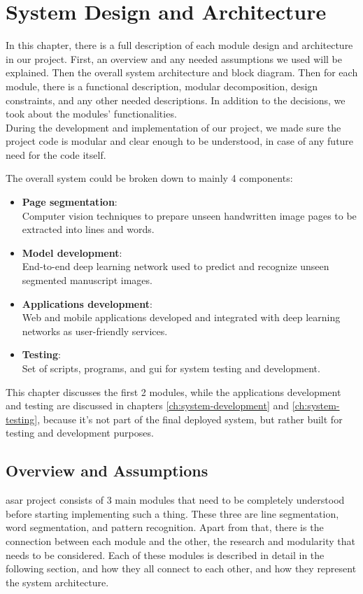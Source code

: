 \chapter{System Design and Architecture}
\label{ch:system-design}
\quad In this chapter, there is a full description of each module design and architecture in our project. First, an overview and any needed assumptions we used will be explained. Then the overall system architecture and block diagram. Then for each module, there is a functional description, modular decomposition, design constraints, and any other needed descriptions. In addition to the decisions, we took about the modules' functionalities. \\

During the development and implementation of our project, we made sure the project code is modular and clear enough to be understood, in case of any future need for the code itself.

\bigskip
\noindent 
The overall system could be broken down to mainly 4 components:
\begin{itemize}[itemsep=1pt, topsep=5pt]
    \item \textbf{Page segmentation}: \\Computer vision techniques to prepare unseen handwritten image pages to be extracted into lines and words.
    \item \textbf{Model development}:\\ End-to-end deep learning network used to predict and recognize unseen segmented manuscript images.
    \item \textbf{Applications development}:\\ Web and mobile applications developed and integrated with deep learning networks as user-friendly services. 
    \item \textbf{Testing}:\\ Set of scripts, programs, and \acrfull{gui} for system testing and development. 
\end{itemize}

This chapter discusses the first 2 modules, while the applications development and testing are discussed in chapters \ref{ch:system-development} and \ref{ch:system-testing}, because it's not part of the final deployed system, but rather built for testing and development purposes.

\clearpage

\section{Overview and Assumptions}
\acrshort{asar} project consists of 3 main modules that need to be completely understood before starting implementing such a thing. These three are line segmentation, word segmentation, and pattern recognition. Apart from that, there is the connection between each module and the other, the research and modularity that needs to be considered. Each of these modules is described in detail in the following section, and how they all connect to each other, and how they represent the system architecture. \\

